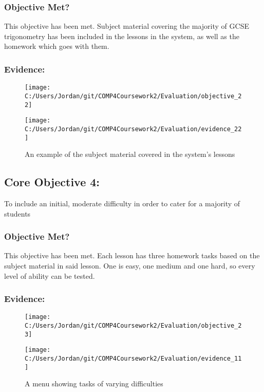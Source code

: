 \subsubsection{Objective Met?}

This objective has been met. Subject material covering the majority of GCSE trigonometry has been included in the lessons in the system, as well as the homework which goes with them.

\subsubsection{Evidence: }

\begin{figure}[H]
	\texttt{[image: C:/Users/Jordan/git/COMP4Coursework2/Evaluation/objective\_22]}
\end{figure}

\begin{figure}[H]
	\texttt{[image: C:/Users/Jordan/git/COMP4Coursework2/Evaluation/evidence\_22]}
	\caption{An example of the subject material covered in the system's lessons}
\end{figure}

\subsection{Core Objective 4: }

To include an initial, moderate difficulty in order to cater for a majority of students

\subsubsection{Objective Met?}

This objective has been met. Each lesson has three homework tasks based on the subject material in said lesson. One is easy, one medium and one hard, so every level of ability can be tested.

\subsubsection{Evidence: }

\begin{figure}[H]
	\texttt{[image: C:/Users/Jordan/git/COMP4Coursework2/Evaluation/objective\_23]}
\end{figure}

\begin{figure}[H]
	\texttt{[image: C:/Users/Jordan/git/COMP4Coursework2/Evaluation/evidence\_11]}
	\caption{A menu showing tasks of varying difficulties}
\end{figure}

